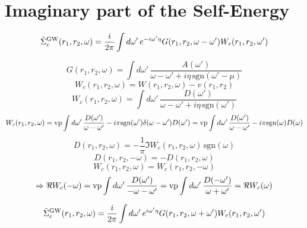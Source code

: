 \documentclass[fleqn]{article}
\begin{document}
\newpage


\section{Imaginary part of the Self-Energy}

\[
  \tilde{\Sigma}^{\rm GW}_c(r_1,r_2,\omega) =
  \frac{i}{2 \pi} \int d\omega' \, e^{-i \omega' \eta} 
  G(r_1,r_2,\omega-\omega')
  W_c(r_1,r_2,\omega')
\]


\[
G(r_1,r_2,\omega) = \int d\omega' \, \frac{A(\omega')}{\omega-\omega'+i\eta \mathrm{\, sgn}(\omega'-\mu)}
\]
\[
W_c(r_1,r_2,\omega) = W(r_1,r_2,\omega) - v(r_1,r_2)
\]
\[
W_c(r_1,r_2,\omega) = \int d\omega' \, \frac{D(\omega')}{\omega-\omega'+i\eta \mathrm{\, sgn}(\omega')}
\]
\[
W_c(r_1,r_2,\omega) = {\rm vp} \int d\omega' \, \frac{D(\omega')}{\omega-\omega'} 
  - i \pi {\rm sgn}(\omega') \delta(\omega-\omega') D(\omega') = 
  {\rm vp} \int d\omega' \, \frac{D(\omega')}{\omega-\omega'} 
  - i \pi {\rm sgn}(\omega) D(\omega)
\]
\[
D(r_1,r_2,\omega) = - \frac{1}{\pi} \Im W_c(r_1,r_2,\omega) \mathrm{\, sgn}(\omega)
\]
\[
D(r_1,r_2,-\omega) = - D(r_1,r_2,\omega)
\]
\[
  W_c(r_1,r_2,\omega) = W_c(r_1,r_2,-\omega)
\]
\[
  \Rightarrow \Re W_c(-\omega) = {\rm vp} \int d\omega' \, \frac{D(\omega')}{-\omega-\omega'} 
    = {\rm vp} \int d\omega' \, \frac{D(-\omega')}{\omega+\omega'} = \Re W_c(\omega)
\]

\[
  \tilde{\Sigma}^{\rm GW}_c(r_1,r_2,\omega) =
  \frac{i}{2 \pi} \int d\omega' \, e^{i \omega' \eta} 
  G(r_1,r_2,\omega+\omega')
  W_c(r_1,r_2,\omega')
\]
\end{document}
